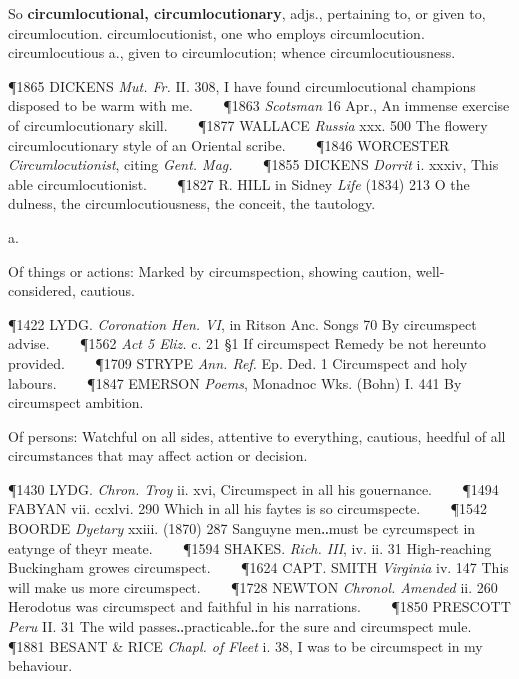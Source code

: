 \begin{description}[wide, labelwidth=!, labelindent=0pt]
\begin{myenumerate}
\vspace{0.1cm} \noindent
So \textbf{circumlocutional, circumlocutionary}, adjs., pertaining to, or given to, circumlocution. circumlocutionist, one who employs circumlocution. circumlocutious a., given to circumlocution; whence circumlocutiousness.

\P 1865 DICKENS  \textit{Mut. Fr.} II. 308, I have found circumlocutional champions disposed to be warm with me.    
\P 1863 \textit{Scotsman}  16 Apr., An immense exercise of circumlocutionary skill.    
\P 1877 WALLACE  \textit{Russia} xxx. 500 The flowery circumlocutionary style of an Oriental scribe.    
\P 1846 WORCESTER  \textit{Circumlocutionist}, citing \textit{Gent. Mag.}    
\P 1855 DICKENS  \textit{Dorrit} i. xxxiv, This able circumlocutionist.    
\P 1827 R. HILL in Sidney \textit{Life} (1834) 213 O the dulness, the circumlocutiousness, the conceit, the tautology.
\end{myenumerate}


 a.

\noindent {}

\vspace{-0.3cm}

\begin{myenumerate}

 Of things or actions: Marked by circumspection, showing caution, well-considered, cautious.

\P 1422 LYDG.  \textit{Coronation Hen. VI}, in Ritson Anc. Songs 70 By circumspect advise.    
\P 1562 \textit{Act  5 Eliz.} c. 21 §1 If circumspect Remedy be not hereunto provided.    
\P 1709 STRYPE  \textit{Ann. Ref.} Ep. Ded. 1 Circumspect and holy labours.    
\P 1847 EMERSON  \textit{Poems}, Monadnoc Wks. (Bohn) I. 441 By circumspect ambition.

 Of persons: Watchful on all sides, attentive to everything, cautious, heedful of all circumstances that may affect action or decision.

\P 1430 LYDG.  \textit{Chron. Troy} ii. xvi, Circumspect in all his gouernance.    
\P 1494 FABYAN vii. ccxlvi. 290 Which in all his faytes is so circumspecte.    
\P 1542 BOORDE  \textit{Dyetary} xxiii. (1870) 287 Sanguyne men‥must be cyrcumspect in eatynge of theyr meate.    
\P 1594 SHAKES.  \textit{Rich. III}, iv. ii. 31 High-reaching Buckingham growes circumspect.    
\P 1624 CAPT. SMITH  \textit{Virginia} iv. 147 This will make us more circumspect.    
\P 1728 NEWTON  \textit{Chronol. Amended} ii. 260 Herodotus was circumspect and faithful in his narrations.    
\P 1850 PRESCOTT  \textit{Peru} II. 31 The wild passes‥practicable‥for the sure and circumspect mule.    
\P 1881 BESANT  \& RICE \textit{Chapl. of Fleet} i. 38, I was to be circumspect in my behaviour.


\end{myenumerate}
\end{description}
